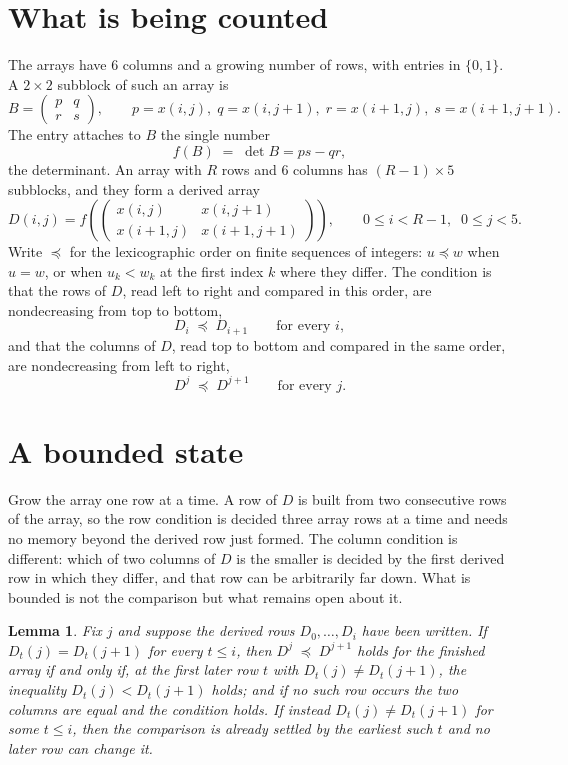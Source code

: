 \documentclass[11pt,a4paper]{article}
\theoremstyle{plain}
\newtheorem{lemma}[theorem]{Lemma}
\theoremstyle{definition}
\begin{document}
\section{What is being counted}

The arrays have $6$ columns and a growing number of rows, with entries in $\{0,1\}$. A
$2\times2$ subblock of such an array is
\[
B=\begin{pmatrix} p & q \\ r & s \end{pmatrix},
\qquad p=x(i,j),\; q=x(i,j+1),\; r=x(i+1,j),\; s=x(i+1,j+1).
\]
The entry attaches to $B$ the single number
\[
f(B)\;=\;\det B=ps-qr,
\]
the determinant. An array with $R$ rows and $6$ columns has $(R-1)\times5$ subblocks, and they
form a derived array
\[
D(i,j)=f\!\left(\begin{pmatrix} x(i,j) & x(i,j+1) \\ x(i+1,j) & x(i+1,j+1)\end{pmatrix}
\right),\qquad 0\le i<R-1,\;\; 0\le j<5 .
\]
Write $\preceq$ for the lexicographic order on finite sequences of integers: $u\preceq w$ when
$u=w$, or when $u_k<w_k$ at the first index $k$ where they differ. The condition is that the
rows of $D$, read left to right and compared in this order, are nondecreasing from top to bottom,
\[
D_{i}\;\preceq\;D_{i+1}\qquad\text{for every } i,
\]
and that the columns of $D$, read top to bottom and compared in the same order, are nondecreasing
from left to right,
\[
D^{j}\;\preceq\;D^{j+1}\qquad\text{for every } j .
\]

\section{A bounded state}

Grow the array one row at a time. A row of $D$ is built from two consecutive rows of the array,
so the row condition is decided three array rows at a time and needs no memory beyond the
derived row just formed. The column condition is different: which of two columns of $D$ is the
smaller is decided by the first derived row in which they differ, and that row can be
arbitrarily far down. What is bounded is not the comparison but what remains open about it.

\begin{lemma}\label{lem:bits}
Fix $j$ and suppose the derived rows $D_0,\dots,D_i$ have been written. If $D_t(j)=D_t(j+1)$ for
every $t\le i$, then $D^{j}\;\preceq\;D^{j+1}$ holds for the finished array if and only if,
at the first later row $t$ with $D_t(j)\neq D_t(j+1)$, the inequality $D_t(j)<D_t(j+1)$
holds; and if no such row occurs the two columns are equal and the condition holds. If instead
$D_t(j)\neq D_t(j+1)$ for some $t\le i$, then the comparison is already settled by the earliest
such $t$ and no later row can change it.
\end{lemma}
\end{document}
